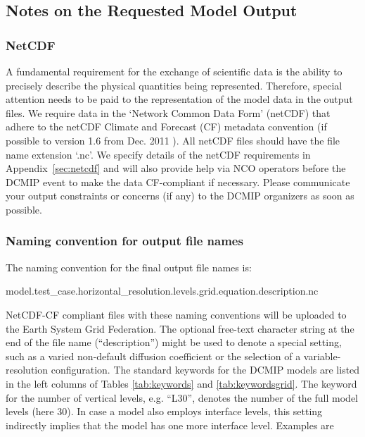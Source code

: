 \documentclass[times,doublespace]{fldauth}
\begin{document}
\subsection{Notes on the Requested Model Output}
\label{sec:notes_output}
\subsubsection{NetCDF}
A fundamental requirement for the exchange of scientific data is the ability to  precisely describe the physical quantities being represented. Therefore, special attention needs to be paid to the representation of the model data in the output files. We require data in the `Network Common Data Form' (netCDF) \cite{netcdf} that adhere to the netCDF Climate and Forecast (CF) metadata convention (if possible to version 1.6 from Dec. 2011 \cite{netcdf-cf}). All netCDF files should have the file name extension `.nc'.
We specify details of the netCDF requirements in Appendix~\ref{sec:netcdf} and will also provide help via NCO operators before the DCMIP event to make the data CF-compliant if necessary. Please communicate your output constraints or concerns (if any) to the DCMIP organizers as soon as possible.

\subsubsection{Naming convention for output file names}
The naming convention for the final output file names is:
\vspace{0.2cm}

\noindent
model.test\_case.horizontal\_resolution.levels.grid.equation.description.nc

\vspace{0.2cm}
\noindent
NetCDF-CF compliant files with these naming conventions will be uploaded to the Earth System Grid Federation.
The optional free-text character string at the end of the file name (``description'') might be used to denote a special setting, such as a varied non-default diffusion coefficient or the selection of a variable-resolution configuration.
The standard keywords for the DCMIP models are listed in the left columns of Tables \ref{tab:keywords} and \ref{tab:keywordsgrid}. The keyword for the number of vertical levels, e.g. ``L30'', denotes the number of the full model levels (here 30). In case a model also employs interface levels, this setting indirectly implies that the model has one more interface level. Examples are \\
\vspace{0.0cm}
\end{document}
